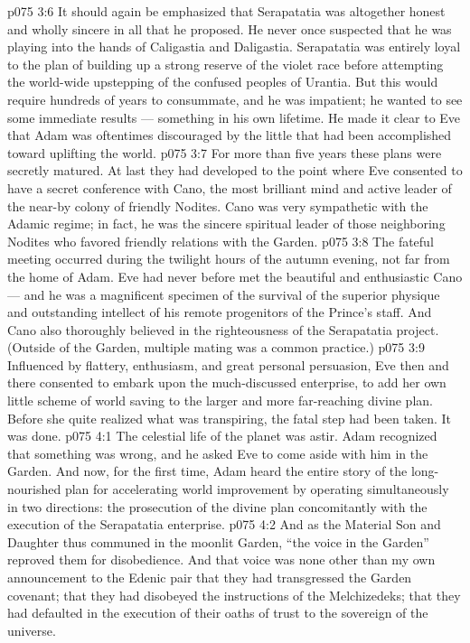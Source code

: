 \vs p075 3:6 It should again be emphasized that Serapatatia was altogether honest and wholly sincere in all that he proposed. He never once suspected that he was playing into the hands of Caligastia and Daligastia. Serapatatia was entirely loyal to the plan of building up a strong reserve of the violet race before attempting the world\hyp{}wide upstepping of the confused peoples of Urantia. But this would require hundreds of years to consummate, and he was impatient; he wanted to see some immediate results --- something in his own lifetime. He made it clear to Eve that Adam was oftentimes discouraged by the little that had been accomplished toward uplifting the world.
\vs p075 3:7 \pc For more than five years these plans were secretly matured. At last they had developed to the point where Eve consented to have a secret conference with Cano, the most brilliant mind and active leader of the near\hyp{}by colony of friendly Nodites. Cano was very sympathetic with the Adamic regime; in fact, he was the sincere spiritual leader of those neighboring Nodites who favored friendly relations with the Garden.
\vs p075 3:8 The fateful meeting occurred during the twilight hours of the autumn evening, not far from the home of Adam. Eve had never before met the beautiful and enthusiastic Cano --- and he was a magnificent specimen of the survival of the superior physique and outstanding intellect of his remote progenitors of the Prince’s staff. And Cano also thoroughly believed in the righteousness of the Serapatatia project. (Outside of the Garden, multiple mating was a common practice.)
\vs p075 3:9 Influenced by flattery, enthusiasm, and great personal persuasion, Eve then and there consented to embark upon the much\hyp{}discussed enterprise, to add her own little scheme of world saving to the larger and more far\hyp{}reaching divine plan. Before she quite realized what was transpiring, the fatal step had been taken. It was done.
\vs p075 4:1 The celestial life of the planet was astir. Adam recognized that something was wrong, and he asked Eve to come aside with him in the Garden. And now, for the first time, Adam heard the entire story of the long\hyp{}nourished plan for accelerating world improvement by operating simultaneously in two directions: the prosecution of the divine plan concomitantly with the execution of the Serapatatia enterprise.
\vs p075 4:2 And as the Material Son and Daughter thus communed in the moonlit Garden, “the voice in the Garden” reproved them for disobedience. And that voice was none other than my own announcement to the Edenic pair that they had transgressed the Garden covenant; that they had disobeyed the instructions of the Melchizedeks; that they had defaulted in the execution of their oaths of trust to the sovereign of the universe.
